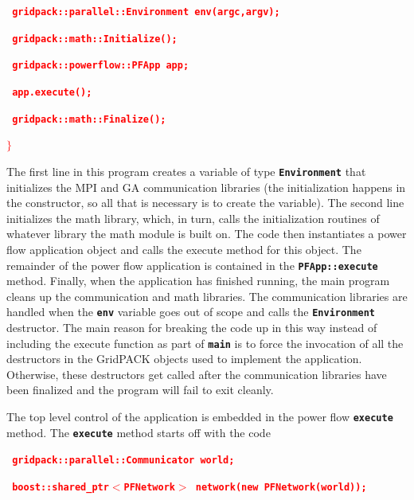 \documentclass[12pt]{report} %
\begin{document}
\textcolor{red}{\texttt{\textbf{  gridpack::parallel::Environment env(argc,argv);}}}

\textcolor{red}{\texttt{\textbf{  gridpack::math::Initialize();}}}

\textcolor{red}{\texttt{\textbf{}}}

\textcolor{red}{\texttt{\textbf{  gridpack::powerflow::PFApp app;}}}

\textcolor{red}{\texttt{\textbf{  app.execute();}}}

\textcolor{red}{\texttt{\textbf{}}}

\textcolor{red}{\texttt{\textbf{  gridpack::math::Finalize();}}}

\textcolor{red}{\texttt{\textbf{$\boldsymbol{\mathrm{\}}}$}}}

The first line in this program creates a variable of type \texttt{\textbf{Environment}} that initializes the MPI and GA communication libraries (the initialization happens in the constructor, so all that is necessary is to create the variable). The second line initializes the math library, which, in turn, calls the initialization routines of whatever library the math module is built on. The code then instantiates a power flow application object and calls the execute method for this object. The remainder of the power flow application is contained in the \texttt{\textbf{PFApp::execute}} method. Finally, when the application has finished running, the main program cleans up the communication and math libraries. The communication libraries are handled when the \texttt{\textbf{env}} variable goes out of scope and calls the \texttt{\textbf{Environment}} destructor. The main reason for breaking the code up in this way instead of including the execute function as part of \texttt{\textbf{main}} is to force the invocation of all the destructors in the GridPACK objects used to implement the application. Otherwise, these destructors get called after the communication libraries have been finalized and the program will fail to exit cleanly.

The top level control of the application is embedded in the power flow \texttt{\textbf{execute}} method. The \texttt{\textbf{execute}} method starts off with the code

\textcolor{red}{\texttt{\textbf{  gridpack::parallel::Communicator world;}}}

\textcolor{red}{\texttt{\textbf{  boost::shared\_ptr$\boldsymbol{\mathrm{<}}$PFNetwork$\boldsymbol{\mathrm{>}}$ network(new PFNetwork(world));}}}
\end{document}

